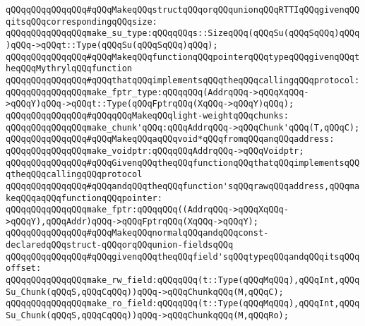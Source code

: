 \newline
\verb|qQQqqQQqqQQqqQQq#qQQqMakeqQQqstructqQQqorqQQqunionqQQqRTTIqQQqgivenqQQqitsqQQqcorrespondingqQQqsize:|\newline
\verb|qQQqqQQqqQQqqQQqmake_su_type:qQQqqQQqs::SizeqQQq(qQQqSu(qQQqSqQQq)qQQq)qQQq->qQQqt::Type(qQQqSu(qQQqSqQQq)qQQq);|\newline
\newline
\verb|qQQqqQQqqQQqqQQq#qQQqMakeqQQqfunctionqQQqpointerqQQqtypeqQQqgivenqQQqtheqQQqMythrylqQQqfunction|\newline
\verb|qQQqqQQqqQQqqQQq#qQQqthatqQQqimplementsqQQqtheqQQqcallingqQQqprotocol:|\newline
\verb|qQQqqQQqqQQqqQQqmake_fptr_type:qQQqqQQq(AddrqQQq->qQQqXqQQq->qQQqY)qQQq->qQQqt::Type(qQQqFptrqQQq(XqQQq->qQQqY)qQQq);|\newline
\newline
\verb|qQQqqQQqqQQqqQQq#qQQqqQQqMakeqQQqlight-weightqQQqchunks:|\newline
\verb|qQQqqQQqqQQqqQQqmake_chunk'qQQq:qQQqAddrqQQq->qQQqChunk'qQQq(T,qQQqC);|\newline
\newline
\verb|qQQqqQQqqQQqqQQq#qQQqMakeqQQqaqQQqvoid*qQQqfromqQQqanqQQqaddress:|\newline
\verb|qQQqqQQqqQQqqQQqmake_voidptr:qQQqqQQqAddrqQQq->qQQqVoidptr;|\newline
\newline
\verb|qQQqqQQqqQQqqQQq#qQQqGivenqQQqtheqQQqfunctionqQQqthatqQQqimplementsqQQqtheqQQqcallingqQQqprotocol|\newline
\verb|qQQqqQQqqQQqqQQq#qQQqandqQQqtheqQQqfunction'sqQQqrawqQQqaddress,qQQqmakeqQQqaqQQqfunctionqQQqpointer:|\newline
\verb|qQQqqQQqqQQqqQQqmake_fptr:qQQqqQQq((AddrqQQq->qQQqXqQQq->qQQqY),qQQqAddr)qQQq->qQQqFptrqQQq(XqQQq->qQQqY);|\newline
\newline
\verb|qQQqqQQqqQQqqQQq#qQQqMakeqQQqnormalqQQqandqQQqconst-declaredqQQqstruct-qQQqorqQQqunion-fieldsqQQq|\newline
\verb|qQQqqQQqqQQqqQQq#qQQqgivenqQQqtheqQQqfield'sqQQqtypeqQQqandqQQqitsqQQqoffset:|\newline
\verb|qQQqqQQqqQQqqQQqmake_rw_field:qQQqqQQq(t::Type(qQQqMqQQq),qQQqInt,qQQqSu_Chunk(qQQqS,qQQqCqQQq))qQQq->qQQqChunkqQQq(M,qQQqC);|\newline
\verb|qQQqqQQqqQQqqQQqmake_ro_field:qQQqqQQq(t::Type(qQQqMqQQq),qQQqInt,qQQqSu_Chunk(qQQqS,qQQqCqQQq))qQQq->qQQqChunkqQQq(M,qQQqRo);|\newline
